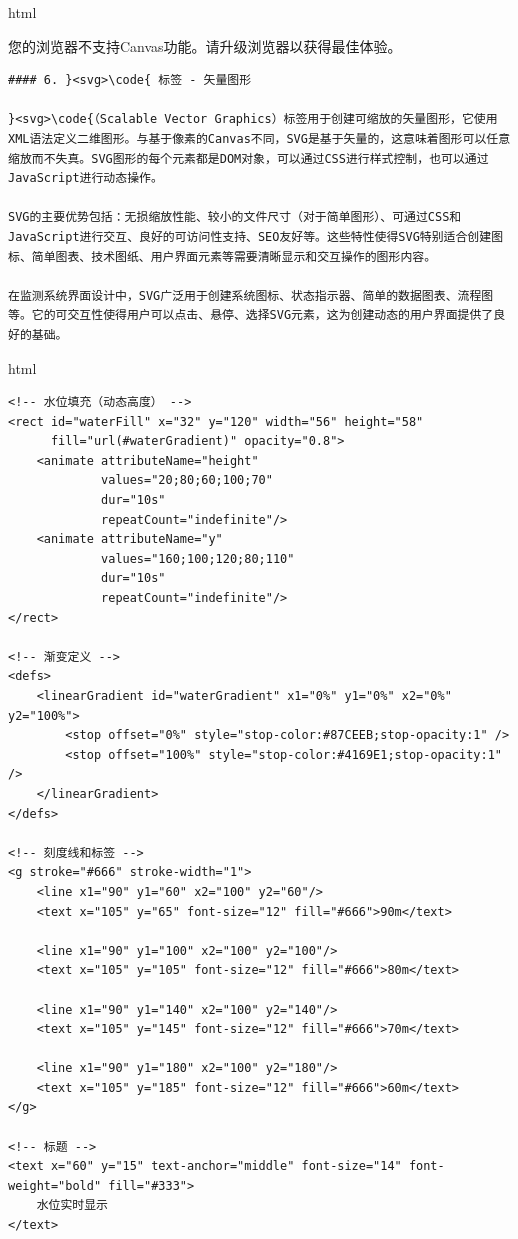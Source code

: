 html

您的浏览器不支持Canvas功能。请升级浏览器以获得最佳体验。

\begin{lstlisting}
#### 6. }<svg>\code{ 标签 - 矢量图形

}<svg>\code{（Scalable Vector Graphics）标签用于创建可缩放的矢量图形，它使用XML语法定义二维图形。与基于像素的Canvas不同，SVG是基于矢量的，这意味着图形可以任意缩放而不失真。SVG图形的每个元素都是DOM对象，可以通过CSS进行样式控制，也可以通过JavaScript进行动态操作。

SVG的主要优势包括：无损缩放性能、较小的文件尺寸（对于简单图形）、可通过CSS和JavaScript进行交互、良好的可访问性支持、SEO友好等。这些特性使得SVG特别适合创建图标、简单图表、技术图纸、用户界面元素等需要清晰显示和交互操作的图形内容。

在监测系统界面设计中，SVG广泛用于创建系统图标、状态指示器、简单的数据图表、流程图等。它的可交互性使得用户可以点击、悬停、选择SVG元素，这为创建动态的用户界面提供了良好的基础。

\end{lstlisting}

html

\begin{verbatim}
<!-- 水位填充（动态高度） -->
<rect id="waterFill" x="32" y="120" width="56" height="58" 
      fill="url(#waterGradient)" opacity="0.8">
    <animate attributeName="height" 
             values="20;80;60;100;70" 
             dur="10s" 
             repeatCount="indefinite"/>
    <animate attributeName="y" 
             values="160;100;120;80;110" 
             dur="10s" 
             repeatCount="indefinite"/>
</rect>

<!-- 渐变定义 -->
<defs>
    <linearGradient id="waterGradient" x1="0%" y1="0%" x2="0%" y2="100%">
        <stop offset="0%" style="stop-color:#87CEEB;stop-opacity:1" />
        <stop offset="100%" style="stop-color:#4169E1;stop-opacity:1" />
    </linearGradient>
</defs>

<!-- 刻度线和标签 -->
<g stroke="#666" stroke-width="1">
    <line x1="90" y1="60" x2="100" y2="60"/>
    <text x="105" y="65" font-size="12" fill="#666">90m</text>
    
    <line x1="90" y1="100" x2="100" y2="100"/>
    <text x="105" y="105" font-size="12" fill="#666">80m</text>
    
    <line x1="90" y1="140" x2="100" y2="140"/>
    <text x="105" y="145" font-size="12" fill="#666">70m</text>
    
    <line x1="90" y1="180" x2="100" y2="180"/>
    <text x="105" y="185" font-size="12" fill="#666">60m</text>
</g>

<!-- 标题 -->
<text x="60" y="15" text-anchor="middle" font-size="14" font-weight="bold" fill="#333">
    水位实时显示
</text>
\end{verbatim}

